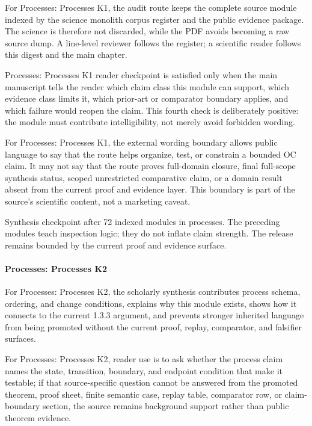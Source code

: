 For Processes: Processes K1, the audit route keeps the complete source module indexed by the science monolith corpus register and the public evidence package. The science is therefore not discarded, while the PDF avoids becoming a raw source dump. A line-level reviewer follows the register; a scientific reader follows this digest and the main chapter.


Processes: Processes K1 reader checkpoint is satisfied only when the main manuscript tells the reader which claim class this module can support, which evidence class limits it, which prior-art or comparator boundary applies, and which failure would reopen the claim. This fourth check is deliberately positive: the module must contribute intelligibility, not merely avoid forbidden wording.


For Processes: Processes K1, the external wording boundary allows public language to say that the route helps organize, test, or constrain a bounded OC claim. It may not say that the route proves full-domain closure, final full-scope synthesis status, scoped unrestricted comparative claim, or a domain result absent from the current proof and evidence layer. This boundary is part of the source's scientific content, not a marketing caveat.


Synthesis checkpoint after 72 indexed modules in processes. The preceding modules teach inspection logic; they do not inflate claim strength. The release remains bounded by the current proof and evidence surface.


\paragraph{Processes: Processes K2}

For Processes: Processes K2, the scholarly synthesis contributes process schema, ordering, and change conditions, explains why this module exists, shows how it connects to the current 1.3.3 argument, and prevents stronger inherited language from being promoted without the current proof, replay, comparator, and falsifier surfaces.


For Processes: Processes K2, reader use is to ask whether the process claim names the state, transition, boundary, and endpoint condition that make it testable; if that source-specific question cannot be answered from the promoted theorem, proof sheet, finite semantic case, replay table, comparator row, or claim-boundary section, the source remains background support rather than public theorem evidence.


